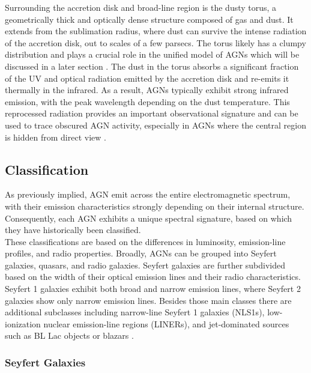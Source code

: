 Surrounding the accretion disk and broad-line region is the dusty torus, a geometrically thick and optically dense structure composed of gas and dust. It extends from the sublimation radius, where dust can survive the intense radiation of the accretion disk, out to scales of a few parsecs. The torus likely has a clumpy distribution and plays a crucial role in the unified model of AGNs which will be discussed in a later section \parencite{netzer2013agn,hickox2018obscured}.
The dust in the torus absorbs a significant fraction of the UV and optical radiation emitted by the accretion disk and re-emits it thermally in the infrared. As a result, AGNs typically exhibit strong infrared emission, with the peak wavelength depending on the dust temperature. This reprocessed radiation provides an important observational signature and can be used to trace obscured AGN activity, especially in AGNs where the central region is hidden from direct view \parencite{netzer2013agn}.





\subsection{Classification}
\label{sec:classification}
As previously implied, AGN emit across the entire electromagnetic spectrum, with their emission characteristics strongly depending on their internal structure. Consequently, each AGN exhibits a unique spectral signature, based on which they have historically been classified.\\
These classifications are based on the differences in luminosity, emission-line profiles, and radio properties. Broadly, AGNs can be grouped into Seyfert galaxies, quasars, and radio galaxies. Seyfert galaxies are further subdivided based on the width of their optical emission lines and their radio characteristics. Seyfert 1 galaxies exhibit both broad and narrow emission lines, where Seyfert 2 galaxies show only narrow emission lines. Besides those main classes there are additional subclasses including narrow-line Seyfert 1 galaxies (NLS1s), low-ionization nuclear emission-line regions (LINERs), and jet-dominated sources such as BL Lac objects or blazars \parencite{antonucci1993unified, urry1995unified}.

\subsubsection{Seyfert Galaxies}


